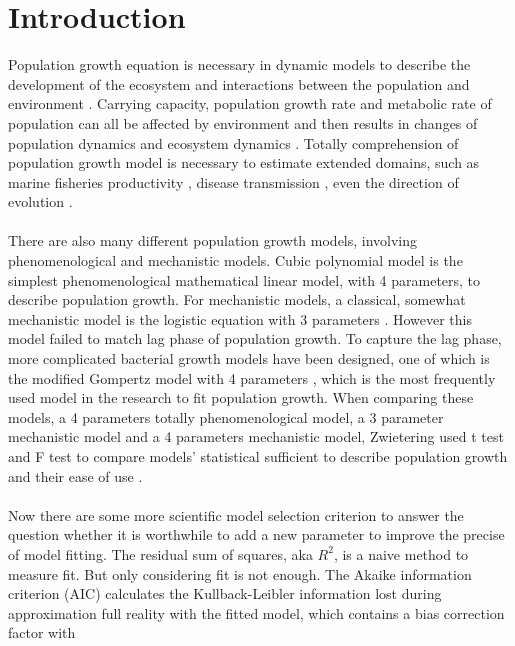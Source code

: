 \documentclass[11pt]{article}
\begin{document}
  \section{Introduction}
    Population growth equation is necessary in dynamic models to describe the development of the ecosystem 
    and interactions between the population and environment \citep{GAMITO199883}. 
    Carrying capacity, population growth rate and metabolic rate of population can all be affected 
    by environment and then results in changes of population dynamics and ecosystem dynamics \citep{BernhardtJoeyR2018MTat}. 
    Totally comprehension of population growth model is necessary to estimate extended domains, such 
    as marine fisheries productivity \citep{SARKER20171}, disease transmission \citep{AldilaDipo2019APDM}, 
    even the direction of evolution \citep{AndrewP.Hendry2017EDiC}.\\
    \\
    There are also many different population growth models, involving phenomenological and mechanistic models. 
    Cubic polynomial model is the simplest phenomenological mathematical linear model, with 4 parameters, to 
    describe population growth. For mechanistic models, a classical, somewhat mechanistic model is the 
    logistic equation with 3 parameters \citep{Peleg1997}. However this model failed to match lag phase of population growth. 
    To capture the lag phase, more complicated bacterial growth models have been designed, one of which
    is the modified Gompertz model with 4 parameters \citep{M.H.Zwietering1990MotB}, which is the most 
    frequently used model in the research to fit population growth. When comparing these models, 
    a 4 parameters totally phenomenological model, a 3 parameter mechanistic model and a 4 parameters 
    mechanistic model, Zwietering used t test and F test to compare models' statistical sufficient to describe 
    population growth and their ease of use \citep{M.H.Zwietering1990MotB}.\\
    \\
    Now there are some more scientific model selection criterion to answer the question whether it is 
    worthwhile to add a new parameter to improve the precise of model fitting. The residual sum of squares, 
    aka $R^2$, is a naive method to measure fit. But only considering fit is not enough. The Akaike 
    information criterion (AIC) \citep{BurnhamKennethP2002Msam} calculates the Kullback-Leibler information lost 
    during approximation full reality with the fitted model, which contains a bias correction factor with 
\end{document}
